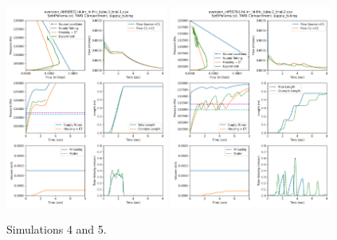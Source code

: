 \documentclass[letterpaper]{article}
\begin{document}
\begin{figure}\centering
\includegraphics[width=0.475\textwidth]{9Files_Sim_outputs/Set4redo22-Aug.png}
\includegraphics[width=0.475\textwidth]{9Files_Sim_outputs/Set5redo22-Aug.png}
\caption{Simulations 4 and 5.}
\end{figure}
\end{document}
